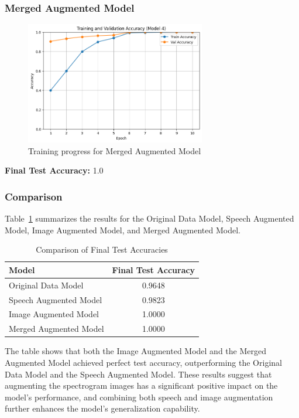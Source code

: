 \documentclass[a4paper,12pt]{article}
\begin{document}
\subsubsection{Merged Augmented Model}
\begin{figure}[H]
\centering
\includegraphics[width=0.7\textwidth]{model4_prog.png} %
\caption{Training progress for Merged Augmented Model}
\label{fig:model4_prog}
\end{figure}

\textbf{Final Test Accuracy: } 1.0



\subsubsection{Comparison}
Table~\ref{tab:acc_comparison} summarizes the results for the Original Data Model, Speech Augmented Model, Image Augmented Model, and Merged Augmented Model.

\begin{table}[H]
\centering
\caption{Comparison of Final Test Accuracies}
\label{tab:acc_comparison}
\begin{tabular}{l c}
\hline
\textbf{Model} & \textbf{Final Test Accuracy} \\
\hline
Original Data Model      & 0.9648 \\
Speech Augmented Model   & 0.9823 \\
Image Augmented Model    & 1.0000 \\
Merged Augmented Model   & 1.0000 \\
\hline
\end{tabular}
\end{table}

The table shows that both the Image Augmented Model and the Merged Augmented Model achieved perfect test accuracy, outperforming the Original Data Model and the Speech Augmented Model. These results suggest that augmenting the spectrogram images has a significant positive impact on the model’s performance, and combining both speech and image augmentation further enhances the model's generalization capability.
\end{document}
